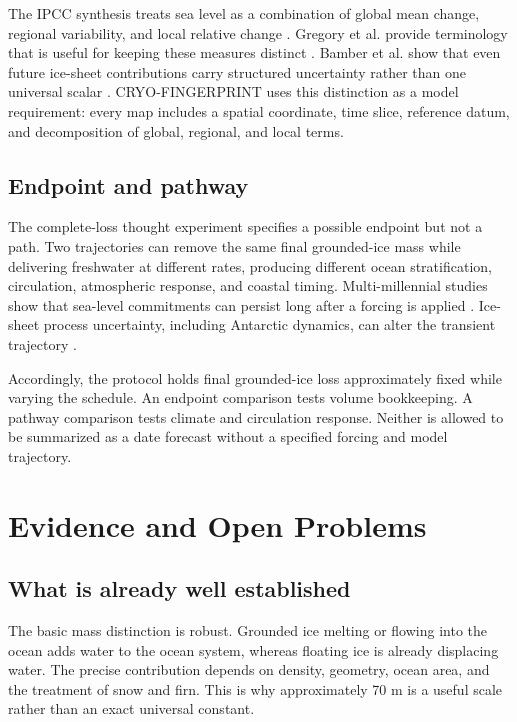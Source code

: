 \documentclass[conference]{IEEEtran}
\begin{document}
The IPCC synthesis treats sea level as a combination of global mean change, regional variability, and local relative change \cite{ipcc}. Gregory et al. provide terminology that is useful for keeping these measures distinct \cite{gregory}. Bamber et al. show that even future ice-sheet contributions carry structured uncertainty rather than one universal scalar \cite{bamber}. CRYO-FINGERPRINT uses this distinction as a model requirement: every map includes a spatial coordinate, time slice, reference datum, and decomposition of global, regional, and local terms.

\subsection{Endpoint and pathway}

The complete-loss thought experiment specifies a possible endpoint but not a path. Two trajectories can remove the same final grounded-ice mass while delivering freshwater at different rates, producing different ocean stratification, circulation, atmospheric response, and coastal timing. Multi-millennial studies show that sea-level commitments can persist long after a forcing is applied \cite{levermann,clark}. Ice-sheet process uncertainty, including Antarctic dynamics, can alter the transient trajectory \cite{deconto}.

Accordingly, the protocol holds final grounded-ice loss approximately fixed while varying the schedule. An endpoint comparison tests volume bookkeeping. A pathway comparison tests climate and circulation response. Neither is allowed to be summarized as a date forecast without a specified forcing and model trajectory.

\section{Evidence and Open Problems}

\subsection{What is already well established}

The basic mass distinction is robust. Grounded ice melting or flowing into the ocean adds water to the ocean system, whereas floating ice is already displacing water. The precise contribution depends on density, geometry, ocean area, and the treatment of snow and firn. This is why approximately 70 m is a useful scale rather than an exact universal constant.
\end{document}
